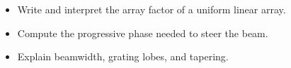 \begin{objectives}
\begin{itemize}[leftmargin=1.4em,itemsep=2pt]
\item Write and interpret the array factor of a uniform linear array.
\item Compute the progressive phase needed to steer the beam.
\item Explain beamwidth, grating lobes, and tapering.
\end{itemize}
\end{objectives}
